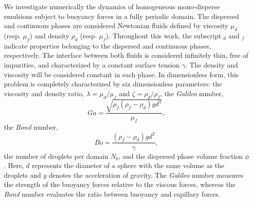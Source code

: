 We investigate numerically the dynamics of homogeneous mono-disperse emulsions subject to buoyancy forces in a fully periodic domain. 
The dispersed and continuous phases are considered Newtonian fluids defined by viscosity $\mu_d$ (resp. $\mu_f$) and density $\rho_d$ (resp. $\mu_f$).
Throughout this work, the subscript $_d$ and $_f$ indicate properties belonging to the dispersed and continuous phases, respectively. 
The interface between both fluids is considered infinitely thin, free of impurities, and characterized by a constant surface tension $\gamma$. %
The density and viscosity will be considered constant in each phase.
In dimensionless form, this problem is completely characterized by six dimensionless parameters:  the viscosity and density ratio, $\lambda = \mu_d / \mu_f$ and $\zeta = \rho_d / \rho_f$,  
the \textit{Galileo} number, 
\begin{equation*}
    Ga =\frac{\sqrt{\rho_f(\rho_f - \rho_d) g d^3}}{\mu_f},
\end{equation*}
the \textit{Bond} number, 
\begin{equation*}
    Bo =\frac{(\rho_f - \rho_d) g d^2}{\gamma},
\end{equation*}
the number of droplets per domain $N_b$, and the dispersed phase volume fraction $\phi$. 
Here, $d$ represents the diameter of a sphere with the same volume as the droplets and $g$ denotes the acceleration of gravity.
The \textit{Galileo} number measures the strength of the buoyancy forces relative to the viscous forces, whereas the \textit{Bond} number evaluates the ratio between buoyancy and capillary forces. 

